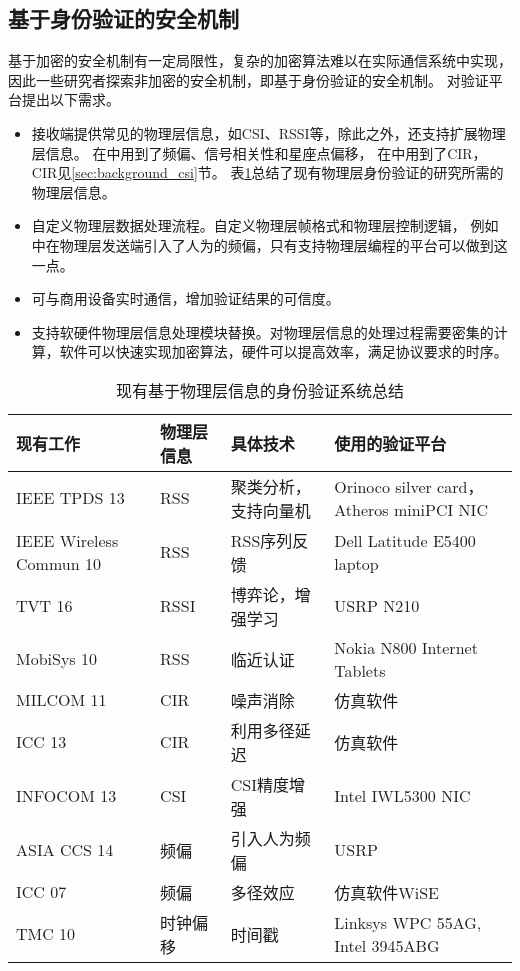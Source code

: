 		\subsection{基于身份验证的安全机制}\label{subsec:demand_identification}
		基于加密的安全机制有一定局限性，复杂的加密算法难以在实际通信系统中实现\cite{ccs16mumimo}，
		因此一些研究者探索非加密的安全机制，即基于身份验证的安全机制\cite{ieeewc10noncryp}。
		对验证平台提出以下需求。
		\begin{itemize}
			\item 接收端提供常见的物理层信息，如CSI、RSSI等，除此之外，还支持扩展物理层信息。
			在\cite{mobicom08radiometric}中用到了频偏、信号相关性和星座点偏移，
			在\cite{milcom11cir}中用到了CIR，CIR见\ref{sec:background_csi}节。
			表\ref{tab:phy_auth_summary}总结了现有物理层身份验证的研究所需的物理层信息。
			\item 自定义物理层数据处理流程。自定义物理层帧格式和物理层控制逻辑，
			例如\cite{asiaccs14csi}中在物理层发送端引入了人为的频偏，只有支持物理层编程的平台可以做到这一点。
			\item 可与商用设备实时通信，增加验证结果的可信度。
			\item 支持软硬件物理层信息处理模块替换。对物理层信息的处理过程需要密集的计算，软件可以快速实现加密算法，硬件可以提高效率，满足协议要求的时序。
		\end{itemize}
		\begin{table}[!hbp]
		\centering
		\caption{现有基于物理层信息的身份验证系统总结}
		\label{tab:phy_auth_summary}
			\begin{tabular}{|p{0.2\textwidth}|l|p{}|p{}|} \hline
			现有工作 & 物理层信息 & 具体技术 & 使用的验证平台 \\ \hline
			IEEE TPDS 13\cite{tpds13spoofing} & RSS & 聚类分析，支持向量机 & Orinoco silver card，Atheros miniPCI NIC \\ \hline
			IEEE Wireless Commun 10\cite{ieeewc10noncryp} & RSS & RSS序列反馈 & Dell Latitude E5400 laptop \\ \hline
			TVT 16\cite{tvt16spoofing} & RSSI & 博弈论，增强学习 & USRP N210 \\ \hline
			MobiSys 10\cite{mobisys10proximity} & RSS & 临近认证 & Nokia N800 Internet Tablets \\ \hline
			MILCOM 11\cite{milcom11cir} & CIR & 噪声消除 & 仿真软件 \\ \hline
			ICC 13\cite{icc13cir} & CIR & 利用多径延迟 & 仿真软件 \\ \hline
			INFOCOM 13\cite{infocom13csi} & CSI & CSI精度增强 & Intel IWL5300 NIC \\ \hline
			ASIA CCS 14\cite{asiaccs14csi} & 频偏 & 引入人为频偏 & USRP \\ \hline
			ICC 07\cite{icc07xiao} & 频偏 & 多径效应 & 仿真软件WiSE\cite{bell95wise} \\ \hline
			TMC 10\cite{tmc10clock} & 时钟偏移 & 时间戳 & Linksys WPC 55AG, Intel 3945ABG \\ \hline
			\end{tabular}
		\end{table}

